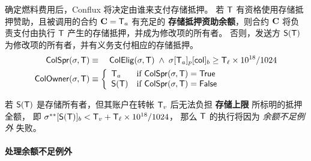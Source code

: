 确定燃料费用后，Conflux 将决定由谁来支付存储抵押。
若 $\textsf{T}$ 有资格使用存储抵押赞助，且被调用的合约 $\mathbf{C}=\textsf{T}_a$ 有充足的 \textbf{存储抵押资助余额}，则合约 $\mathbf{C}$ 将负责支付由执行 $\textsf{T}$ 产生的存储抵押，并成为修改项的所有者。
%
否则，发送方 $\mathsf{S}{\left({\textsf{T}} \right)}$ 为修改项的所有者，并有义务支付相应的存储抵押。
%
\begin{align}
	\mathsf{ColSpr}(\mathbf{\sigma},\textsf{T}) &\equiv\quad  \mathsf{ColElig}(\mathbf{\sigma},\textsf{T}) \;\wedge\; \mathbf{\sigma}[\textsf{T}_a]_p[{\sf col}]_b\ge \textsf{T}_\ell\times 10^{18}/1024 \\
	\mathsf{ColOwner}(\mathbf{\sigma},\textsf{T}) &\equiv\left\{ \begin{array}{ll}
		\textsf{T}_a & \text{if } \mathsf{ColSpr}(\mathbf{\sigma},\textsf{T}) = \mathsf{True} \\ 
		\mathsf{S}{\left({\textsf{T}} \right)} & \text{if } \mathsf{ColSpr}(\mathbf{\sigma},\textsf{T}) = \mathsf{False} \\ 
	\end{array}\right.
\end{align}

若 $\mathsf{S}{\left({\textsf{T}} \right)}$ 是存储所有者，但其账户在转帐 $\textsf{T}_v$ 后无法负担 {\bf 存储上限} 所标明的抵押全额，
即 $\mathbf{\sigma}^{**}[\mathsf{S}{\left({\textsf{T}} \right)}]_b<\textsf{T}_v+\textsf{T}_\ell\times 10^{18}/1024$，
那么 $\textsf{T}$ 的执行将因为 \emph{余额不足例外} 失败。

\paragraph{处理余额不足例外} 

